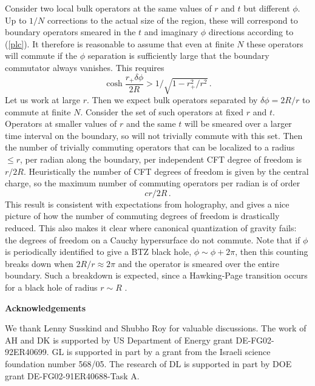 \documentclass[12pt]{article}
\begin{document}
Consider two local bulk operators at the same values of $r$ and $t$
but different $\phi$. Up to $1/N$ corrections to the actual size of
the region, these will correspond to boundary operators smeared in the
$t$ and imaginary $\phi$ directions according to (\ref{plc}). It
therefore is reasonable to assume that even at finite $N$ these
operators will commute if the $\phi$ separation is sufficiently large
that the boundary commutator always vanishes. This requires
\begin{equation}
\label{dphisep}
\cosh \frac{r_+\delta \phi}{2 R} > 1 / \sqrt{1-r^{2}_{+}/r^{2}}\,.
\end{equation}
Let us work at large $r$.  Then we expect bulk operators separated by
$\delta \phi = 2R/r$ to commute at finite $N$.  Consider the set of
such operators at fixed $r$ and $t$. Operators at smaller values of
$r$ and the same $t$ will be smeared over a larger time interval on
the boundary, so will not trivially commute with this set. Then the
number of trivially commuting operators that can be localized to a
radius $\leq r$, per radian along the boundary, per independent CFT
degree of freedom is $r/2R$.  Heuristically the number of CFT degrees
of freedom is given by the central charge, so the maximum number of
commuting operators per radian is of order
\begin{equation}
cr/2R\,.
\end{equation}
This result is consistent with expectations from holography, and gives
a nice picture of how the number of commuting degrees of freedom is
drastically reduced. This also makes it clear where canonical
quantization of gravity fails: the degrees of freedom on a Cauchy
hypersurface do not commute.  Note that if $\phi$ is periodically
identified to give a BTZ black hole, $\phi \sim \phi + 2 \pi$, then
this counting breaks down when $2R/r \approx 2\pi$ and the operator is
smeared over the entire boundary.  Such a breakdown is expected, since
a Hawking-Page transition occurs for a black hole of radius $r \sim R$
\cite{Birmingham:2002ph}.

\bigskip
\centerline{{\bf Acknowledgements}}
\noindent
We thank Lenny Susskind and Shubho Roy for valuable discussions.  The
work of AH and DK is supported by US Department of Energy grant
DE-FG02-92ER40699.  GL is supported in part by a grant from the
Israeli science foundation number 568/05.  The research of DL is
supported in part by DOE grant DE-FG02-91ER40688-Task A.

\appendix
\end{document}
